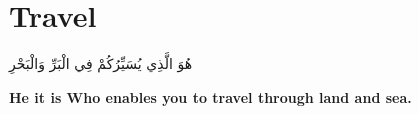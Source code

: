 \chapter{Travel}
\begin{center}
    {\Huge    
        \begin{Arabic}
            هُوَ الَّذِي يُسَيِّرُكُمْ فِي الْبَرِّ وَالْبَحْرِ
        \end{Arabic}
    }    
\end{center}
\vspace*{\fill}
\vspace{3cm}
\begin{center}
    \large \textbf{He it is Who enables you to travel through land and sea.}
\end{center}
